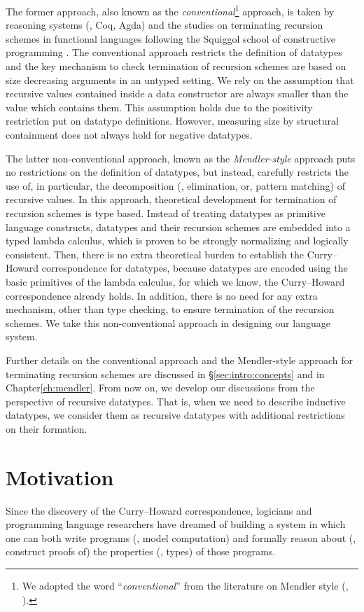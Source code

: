 The former approach, also known as the \emph{conventional}\footnote{
        We adopted the word ``\emph{conventional}'' from the literature
        on Mendler style (\eg, \cite{AbeMat04}).}
approach, is taken by reasoning systems (\eg, Coq, Agda) and the studies on
terminating recursion schemes in functional languages following
the Squiggol school of constructive programming \cite{AoP,hagino87phd,Bir87}.
The conventional approach restricts the definition of datatypes and
the key mechanism to check termination of recursion schemes are based on
size decreasing arguments in an untyped setting. We rely on the assumption
that recursive values contained inside a data constructor are always
smaller than the value which contains them. This assumption holds due to
the positivity restriction put on datatype definitions. However, measuring
size by structural containment does not always hold for negative datatypes.

The latter non-conventional approach, known as the \emph{Mendler-style} approach
puts no restrictions on the definition of datatypes, but instead, carefully
restricts the use of, in particular, the decomposition (\ie, elimination, or,
pattern matching) of recursive values. In this approach, theoretical
development for termination of recursion schemes is type based.
Instead of treating datatypes as primitive language constructs, datatypes
and their recursion schemes are embedded into a typed lambda calculus,
which is proven to be strongly normalizing and logically consistent.
Then, there is no extra theoretical burden to establish
the Curry--Howard correspondence for datatypes, because datatypes are
encoded using the basic primitives of the lambda calculus, for which we
know, the Curry--Howard correspondence already holds. In addition, there is
no need for any extra mechanism, other than type checking, to ensure
termination of the recursion schemes. We take this non-conventional
approach in designing our language system.

Further details on the conventional approach and the Mendler-style approach
for terminating recursion schemes are discussed in \S\ref{sec:intro:concepts}
and in Chapter\;\ref{ch:mendler}. From now on, we develop our discussions
from the perspective of recursive datatypes. That is, when we need to describe
inductive datatypes, we consider them as recursive datatypes with additional
restrictions on their formation.

\section{Motivation}\label{sec:intro:motiv}
Since the discovery of the Curry--Howard correspondence, logicians and
programming language researchers have dreamed of building a system in which
one can both write programs (\ie, model computation) and formally reason about
(\ie, construct proofs of) the properties (\ie, types) of those programs.

